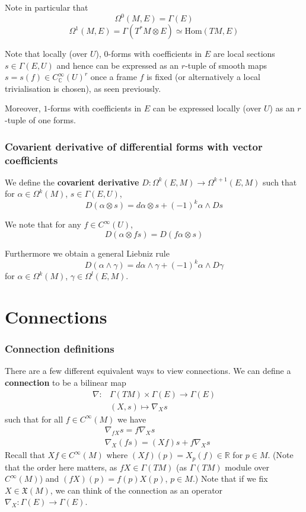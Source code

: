 \documentclass[a4paper]{article}
\theoremstyle{definition} \newtheorem*{definition}{Definition}
\theoremstyle{definition} \newtheorem*{definitions}{Definitions}
\theoremstyle{plain} \newtheorem{theorem}{Theorem}[section]
\theoremstyle{plain} \newtheorem{proposition}[theorem]{Proposition}
\theoremstyle{plain} \newtheorem{corollary}[theorem]{Corollary}
\theoremstyle{plain} \newtheorem{lemma}[theorem]{Lemma}
\theoremstyle{plain} \newtheorem{example}[theorem]{Example}
\newcommand{\defn}[1]{\textbf{#1}}
\newcommand{\realnos}{\mathbb{R}}
\newcommand{\complexnos}{\mathbb{C}}
\newcommand{\smoothCmaps}{C^\infty_\complexnos (U)}
\newcommand{\Hom}{\text{Hom}}
\newcommand{\smooth}{C^\infty}
\begin{document}
Note in particular that 
$$\Omega^0(M, E) = \Gamma(E)$$
$$\Omega^1(M, E) = \Gamma(T^\ast M \otimes E) \simeq \Hom(TM, E)$$

Note that locally (over $U$),  $0$-forms with coefficients in $E$ are local sections $s\in \Gamma(E, U)$ and hence can be expressed as an $r$-tuple of smooth maps $s=s(f)\in \smoothCmaps^r$ once a frame $f$ is fixed (or alternatively a local trivialisation is chosen),  as seen previously.  

Moreover,  $1$-forms with coefficients in $E$ can be expressed locally (over $U$) as an $r$-tuple of one forms.

\subsubsection{Covarient derivative of differential forms with vector coefficients}
We define the \defn{covarient derivative} $D:\Omega^k(E, M)\to \Omega^{k+1}(E, M)$ such that for $\alpha\in \Omega^k(M)$, $s\in \Gamma(E, U)$,
$$D(\alpha \otimes s)=d\alpha \otimes s + (-1)^k \alpha \wedge Ds$$

We note that for any $f\in \smooth(U)$,
$$D(\alpha \otimes fs) = D (f\alpha \otimes s)$$

Furthermore we obtain a general Liebniz rule
$$D(\alpha \wedge \gamma)=d\alpha \wedge \gamma + (-1)^k \alpha \wedge D\gamma$$
for $\alpha \in \Omega^k(M)$, $\gamma\in \Omega^l(E, M)$. 

\section{Connections}

\subsubsection{Connection definitions}

There are a few different equivalent ways to view connections.
We can define a \defn{connection} to be a bilinear map 
\begin{align*}
\nabla: & \Gamma(TM)\times \Gamma(E)\to \Gamma(E) \\
& (X, s)\mapsto \nabla_X s
\end{align*}
such that for all $f\in \smooth (M)$ we have
\begin{align*}
& \nabla_{fX}s=f\nabla_X s \\
& \nabla_X(fs)=(Xf)s + f\nabla_X s 
\end{align*}
Recall that $Xf\in \smooth(M)$ where $(Xf)(p)=X_p(f)\in \realnos$ for $p\in M$. (Note that the order here matters, as $fX\in \Gamma(TM)$ (as $\Gamma(TM)$ module over $\smooth(M)$) and $(fX)(p) = f(p)X(p)$, $p\in M$.) Note that if we fix 
$X\in \mathfrak{X}(M)$, we can think of the connection as an operator $\nabla_X:\Gamma(E)\to \Gamma(E)$.
\end{document}

